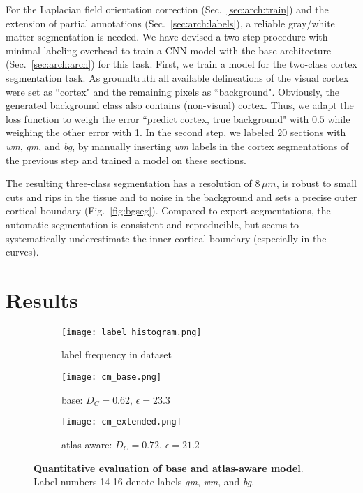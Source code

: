 \documentclass{article}
\begin{document}
For the Laplacian field orientation correction (Sec.~\ref{sec:arch:train}) and the extension of partial annotations (Sec.~\ref{sec:arch:labels}), a reliable gray/white matter segmentation is needed.
%
We have devised a two-step procedure with minimal labeling overhead to train a CNN model with the base architecture (Sec.~\ref{sec:arch:arch}) for this task.
First, we train a model for the two-class cortex segmentation task.
As groundtruth all available delineations of the visual cortex were set as ``cortex" and the remaining pixels as ``background".
Obviously, the generated background class also contains (non-visual) cortex.
Thus, we adapt the loss function to weigh the error ``predict cortex, true background" with $0.5$ while weighing the other error with 1.
In the second step, we labeled $20$ sections with \emph{wm}, \emph{gm}, and \emph{bg}, by manually inserting \emph{wm} labels in the cortex segmentations of the previous step and trained a model on these sections. %

The resulting three-class segmentation has a resolution of $8\,\mu m$, is robust to small cuts and rips in the tissue and to noise in the background and sets a precise outer cortical boundary (Fig.~\ref{fig:bgseg}).
Compared to expert segmentations, the automatic segmentation is consistent and reproducible, but seems to systematically underestimate the inner cortical boundary (especially in the curves).

\section{Results}
\label{sec:res}

\begin{figure}[tb]
	\centering
	\begin{subfigure}[t]{.28\columnwidth}
		\centering
		\texttt{[image: label\_histogram.png]}
		\caption{label frequency in dataset}
		\label{fig:hist}
	\end{subfigure}
	\begin{subfigure}[t]{.34\columnwidth}
		\centering
		\texttt{[image: cm\_base.png]}
		\caption{base: $D_C=0.62$, $\epsilon=23.3$}
		\label{}
	\end{subfigure}
	\begin{subfigure}[t]{.36\columnwidth}
		\centering
		\texttt{[image: cm\_extended.png]}
		\caption{atlas-aware: $D_C=0.72$, $\epsilon=21.2$}
		\label{}
	\end{subfigure}
	\caption{
		\textbf{Quantitative evaluation of base and atlas-aware model}.
		Label numbers 14-16 denote labels \emph{gm}, \emph{wm}, and \emph{bg}.
		}
	\label{fig:cm}
\end{figure}
\end{document}

